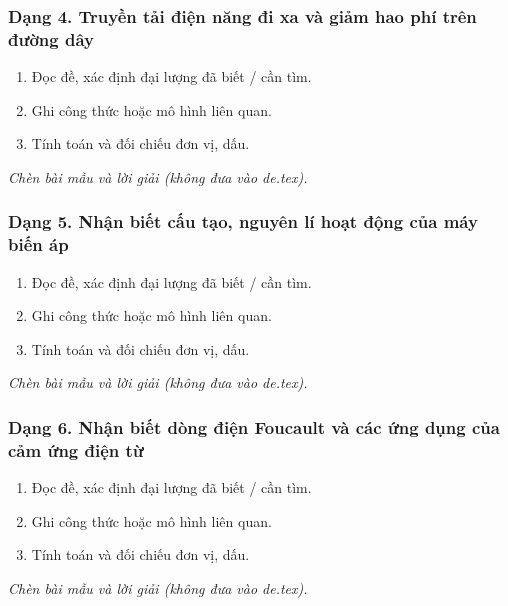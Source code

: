 \subsubsection{Dạng 4. Truyền tải điện năng đi xa và giảm hao phí trên đường dây}
\begin{phuongphap}
\begin{enumerate}
\item Đọc đề, xác định đại lượng đã biết / cần tìm.
\item Ghi công thức hoặc mô hình liên quan.
\item Tính toán và đối chiếu đơn vị, dấu.
\end{enumerate}
\end{phuongphap}
\begin{vidumau}
\textit{Chèn bài mẫu và lời giải (không đưa vào de.tex).}
\end{vidumau}

\subsubsection{Dạng 5. Nhận biết cấu tạo, nguyên lí hoạt động của máy biến áp}
\begin{phuongphap}
\begin{enumerate}
\item Đọc đề, xác định đại lượng đã biết / cần tìm.
\item Ghi công thức hoặc mô hình liên quan.
\item Tính toán và đối chiếu đơn vị, dấu.
\end{enumerate}
\end{phuongphap}
\begin{vidumau}
\textit{Chèn bài mẫu và lời giải (không đưa vào de.tex).}
\end{vidumau}

\subsubsection{Dạng 6. Nhận biết dòng điện Foucault và các ứng dụng của cảm ứng điện từ}
\begin{phuongphap}
\begin{enumerate}
\item Đọc đề, xác định đại lượng đã biết / cần tìm.
\item Ghi công thức hoặc mô hình liên quan.
\item Tính toán và đối chiếu đơn vị, dấu.
\end{enumerate}
\end{phuongphap}
\begin{vidumau}
\textit{Chèn bài mẫu và lời giải (không đưa vào de.tex).}
\end{vidumau}

